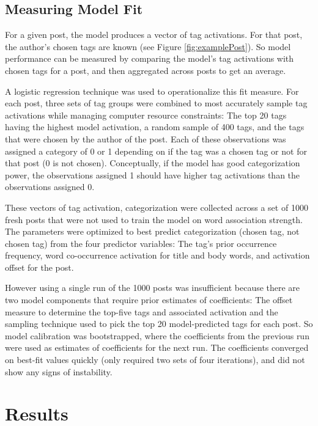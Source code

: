 \documentclass[10pt,letterpaper]{article}
\begin{document}
\subsection{Measuring Model Fit}

For a given post, the model produces a vector of tag activations.
For that post, the author's chosen tags are known (see Figure \ref{fig:examplePost}).
So model performance can be measured by comparing the model's tag activations with chosen tags for a post, and then aggregated across posts to get an average.

A logistic regression technique was used to operationalize this fit measure.
For each post, three sets of tag groups were combined to most accurately sample tag activations while managing computer resource constraints:
The top 20 tags having the highest model activation, a random sample of 400 tags, and the tags that were chosen by the author of the post.
Each of these observations was assigned a category of 0 or 1 depending on if the tag was a chosen tag or not for that post (0 is not chosen).
Conceptually, if the model has good categorization power, the observations assigned 1 should have higher tag activations than the observations assigned 0.

These vectors of tag activation, categorization were collected across a set of \num{1000} fresh posts that were not used to train the model on word association strength.
The parameters were optimized to best predict categorization (chosen tag, not chosen tag) from the four predictor variables:
The tag's prior occurrence frequency, word co-occurrence activation for title and body words, and activation offset for the post.

However using a single run of the \num{1000} posts was insufficient because there are two model components that require prior estimates of coefficients:
The offset measure to determine the top-five tags and associated activation and the sampling technique used to pick the top 20 model-predicted tags for each post.
So model calibration was bootstrapped, where the coefficients from the previous run were used as estimates of coefficients for the next run.
The coefficients converged on best-fit values quickly (only required two sets of four iterations), and did not show any signs of instability.

\section{Results}
\end{document}
